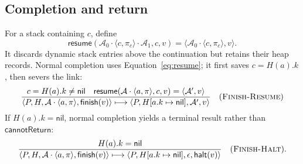 \documentclass[11pt]{article}
\numberwithin{equation}{section}
\newcommand{\kw}[1]{\ensuremath{\mathsf{#1}}}
\newcommand{\nil}{\kw{nil}}
\newcommand{\rulelabel}[1]{\textsc{#1}}
\begin{document}
\subsection{Completion and return}

For a stack containing $c$, define
\begin{equation}\label{eq:resume}
 \mathsf{resume}(\mathcal A_0\cdot\langle c,\pi_c\rangle
                    \cdot\mathcal A_1,c,v)
   =\langle\mathcal A_0\cdot\langle c,\pi_c\rangle,v\rangle.
\end{equation}
It discards dynamic stack entries above the continuation but retains their heap
records.  Normal completion uses Equation~\eqref{eq:resume}; it first saves
$c=H(a).k$, then severs the link:
\[
\dfrac{c=H(a).k\ne\nil\quad
       \mathsf{resume}(\mathcal A\cdot\langle a,\pi\rangle,c,v)
          =\langle\mathcal A',v\rangle}
 {\langle P,H,\mathcal A\cdot\langle a,\pi\rangle,\kw{finish}(v)\rangle
  \longmapsto
  \langle P,H[a.k\mapsto\nil],\mathcal A',v\rangle}
\quad(\rulelabel{Finish-Resume})
\]
If $H(a).k=\nil$, normal completion yields a terminal result rather than
\kw{cannotReturn}:
\[
 \dfrac{H(a).k=\nil}
 {\langle P,H,\mathcal A\cdot\langle a,\pi\rangle,\kw{finish}(v)\rangle
  \longmapsto
  \langle P,H[a.k\mapsto\nil],\epsilon,\kw{halt}(v)\rangle}
 \quad(\rulelabel{Finish-Halt}).
\]
\end{document}
